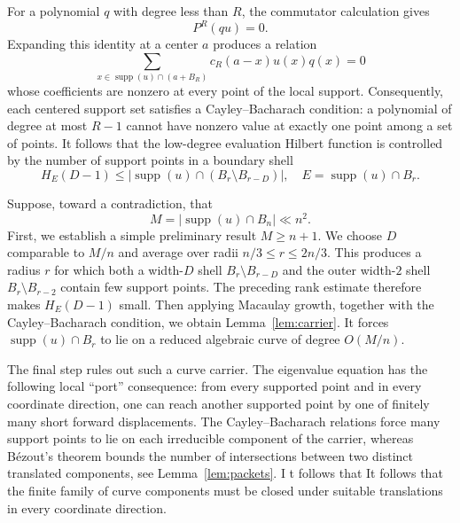 \documentclass[11pt,reqno]{amsart}
\newcommand{\supp}{\operatorname{supp}}
\theoremstyle{definition}
\theoremstyle{plain}
\numberwithin{equation}{section}
\begin{document}
For a polynomial $q$ with degree less than $R$, the commutator calculation gives
\begin{equation*}
    P^R(qu)=0.
\end{equation*}
Expanding this identity at a center $a$ produces a relation
\begin{equation*}
    \sum_{x\in \supp(u)\cap (a+B_R)} c_R(a-x)u(x)q(x)=0
\end{equation*}
whose coefficients are nonzero at every point of the local support. Consequently, each centered support set satisfies a Cayley--Bacharach condition: a polynomial of degree at most $R-1$ cannot have nonzero value at exactly one point among a set of points. It follows that the low-degree evaluation Hilbert function is controlled by the number of support points in a boundary shell
\begin{equation*}
    H_E(D-1)\le |\supp(u)\cap (B_r\setminus B_{r-D})|, \quad E=\supp(u)\cap B_r.
\end{equation*}

Suppose, toward a contradiction, that
\begin{equation*}
    M=\left|\supp(u)\cap B_n\right|\ll n^2.
\end{equation*}
First, we establish a simple preliminary result $M\geq n+1$. We choose
$D$ comparable to $M/n$ and average over radii
$n/3\leq r\leq2n/3$. This produces a radius $r$ for which both a
width-$D$ shell $B_r\setminus B_{r-D}$ and the outer width-$2$ shell $B_r\setminus B_{r-2}$ contain few support
points. The preceding rank estimate therefore makes $H_E(D-1)$
small. Then applying Macaulay growth, together with the
Cayley--Bacharach condition, we obtain Lemma~\ref{lem:carrier}. It forces
$\supp(u)\cap B_r$ to lie on a reduced algebraic curve of degree
$O(M/n)$.

The final step rules out such a curve carrier. The eigenvalue equation
has the following local ``port'' consequence: from every supported
point and in every coordinate direction, one can reach another
supported point by one of finitely many short forward displacements.
The Cayley--Bacharach relations force many support points to lie on
each irreducible component of the carrier, whereas B\'ezout's theorem
bounds the number of intersections between two distinct translated
components, see Lemma~\ref{lem:packets}. I t follows that It follows that the finite family of curve components must 
be closed under suitable translations in every coordinate direction.
\end{document}
